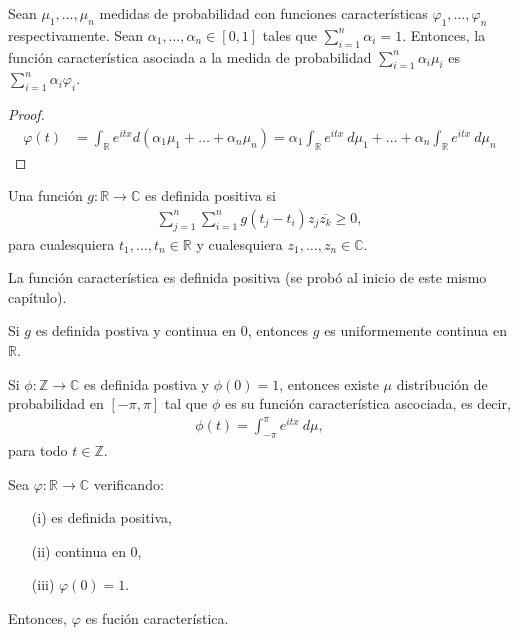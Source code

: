 \begin{lema}
    Sean $\mu_1,\ldots,\mu_n$ medidas de probabilidad con funciones características $\varphi_1,\ldots,\varphi_n$ respectivamente. Sean $\alpha_1,\ldots,\alpha_n \in [0,1]$ tales que $\sum_{i=1}^{n} \alpha_i = 1$. Entonces, la función característica asociada a la medida de probabilidad $\sum_{i=1}^{n} \alpha_i \mu_i$ es $\sum_{i=1}^{n} \alpha_i \varphi_i$.
\end{lema}

\begin{proof}
    \begin{align*}
        \varphi(t) &= \int_{\mathbb{R}} e^{itx} d(\alpha_1 \mu_1 + \ldots + \alpha_n \mu_n) 
        = \alpha_1 \int_{\mathbb{R}} e^{itx} \ d\mu_1 + \ldots + \alpha_n \int_{\mathbb{R}} e^{itx} \ d\mu_n
    \end{align*}
\end{proof}

\begin{defi}
    Una función $g : \mathbb{R} \longrightarrow \mathbb{C}$ es definida positiva si
    \begin{align*}
        \sum_{j=1}^{n} \sum_{i=1}^{n} g(t_j - t_i) z_j \overline{z_k} \ge 0,
    \end{align*}
    para cualesquiera $t_1,\ldots,t_ n\in \mathbb{R}$ y cualesquiera $z_1,\ldots,z_n\in \mathbb{C}$.
\end{defi}

\begin{obs}
    La función característica es definida positiva (se probó al inicio de este mismo capítulo).
\end{obs}

\begin{teo}
    Si $g$ es definida postiva y continua en 0, entonces $g$ es uniformemente continua en $\mathbb{R}$.
\end{teo}

\begin{lema}[Herglotz]
    Si $\phi : \mathbb{Z} \longrightarrow \mathbb{C}$ es definida postiva y $\phi(0) = 1$, entonces existe $\mu$ distribución de probabilidad en $[-\pi,\pi]$ tal que $\phi$ es su función característica ascociada, es decir, 
    \begin{align*}
        \phi(t) = \int_{-\pi}^{\pi} e^{itx} \ d\mu,
    \end{align*}
    para todo $t \in \mathbb{Z}$.
\end{lema}

\begin{teo}[Bochner]
    Sea $\varphi : \mathbb{R} \longrightarrow \mathbb{C}$ verificando:
    \begin{enumerate}
        \item[(i)] es definida positiva,
        \item[(ii)] continua en 0,
        \item[(iii)] $\varphi(0) = 1$.
    \end{enumerate}
    Entonces, $\varphi$ es fución característica.
\end{teo}

